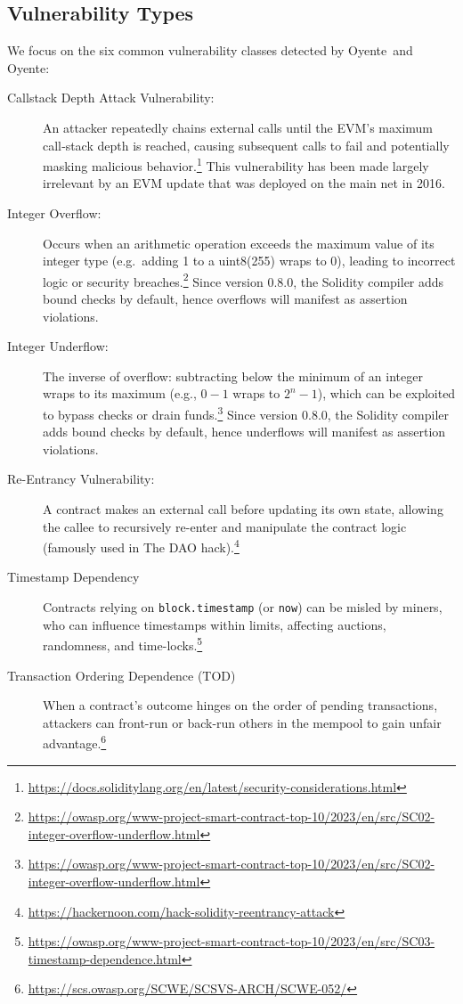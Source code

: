 \documentclass{article}
\newcommand\OY{Oyente}
\newcommand\OYp{\OY\raisebox{0.3ex}{\smaller +}}
\begin{document}
	\subsection{Vulnerability Types}
	We focus on the six common vulnerability classes detected by \OY\ and \OYp:

	\begin{description}
		\item[Callstack Depth Attack Vulnerability:]	An attacker repeatedly chains external calls until the EVM’s maximum call‐stack depth is reached, causing subsequent calls to fail and potentially masking malicious behavior.\footnote{\url{https://docs.soliditylang.org/en/latest/security-considerations.html}} This vulnerability has been made largely irrelevant by an EVM update that was deployed on the main net in 2016.

		\item[Integer Overflow:] Occurs when an arithmetic operation exceeds the maximum value of its integer type (e.g.\ adding 1 to a uint8(255) wraps to 0), leading to incorrect logic or security breaches.\footnote{\url{https://owasp.org/www-project-smart-contract-top-10/2023/en/src/SC02-integer-overflow-underflow.html}} Since version 0.8.0, the Solidity compiler adds bound checks by default, hence overflows will manifest as assertion violations.

		\item[Integer Underflow:] The inverse of overflow: subtracting below the minimum of an integer wraps to its maximum (e.g., $0 - 1$ wraps to $2^n - 1$), which can be exploited to bypass checks or drain funds.\footnote{\url{https://owasp.org/www-project-smart-contract-top-10/2023/en/src/SC02-integer-overflow-underflow.html}} Since version 0.8.0, the Solidity compiler adds bound checks by default, hence underflows will manifest as assertion violations.

		\item[Re-Entrancy Vulnerability:] A contract makes an external call before updating its own state, allowing the callee to recursively re-enter and manipulate the contract logic (famously used in The DAO hack).\footnote{\url{https://hackernoon.com/hack-solidity-reentrancy-attack}}

		\item[Timestamp Dependency]
		Contracts relying on \texttt{block.timestamp} (or \texttt{now}) can be misled by miners, who can influence timestamps within limits, affecting auctions, randomness, and time-locks.\footnote{\url{https://owasp.org/www-project-smart-contract-top-10/2023/en/src/SC03-timestamp-dependence.html}}

		\item[Transaction Ordering Dependence (TOD)]
		When a contract’s outcome hinges on the order of pending transactions, attackers can front-run or back-run others in the mempool to gain unfair advantage.\footnote{\url{https://scs.owasp.org/SCWE/SCSVS-ARCH/SCWE-052/}}
	\end{description}
\end{document}
